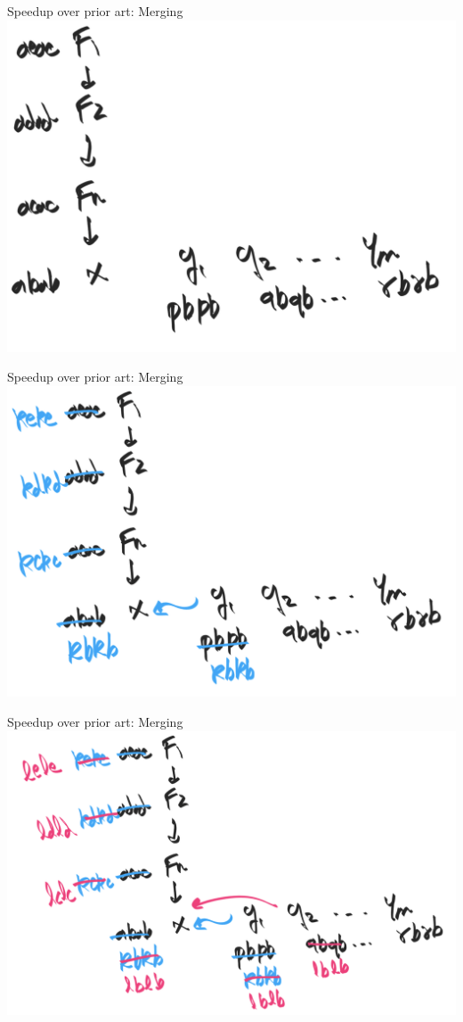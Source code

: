 \documentclass[8pt]{beamer}
\begin{document}
\begin{frame}[fragile]{Speedup over prior art: Merging}
\includegraphics[width=\textwidth]{./eg-2-1.png}
\end{frame}

\begin{frame}[fragile]{Speedup over prior art: Merging}
\includegraphics[width=\textwidth]{./eg-2-2.png}
\end{frame}

\begin{frame}[fragile]{Speedup over prior art: Merging}
\includegraphics[width=\textwidth]{./eg-2-3.png}
\end{frame}
\end{document}
